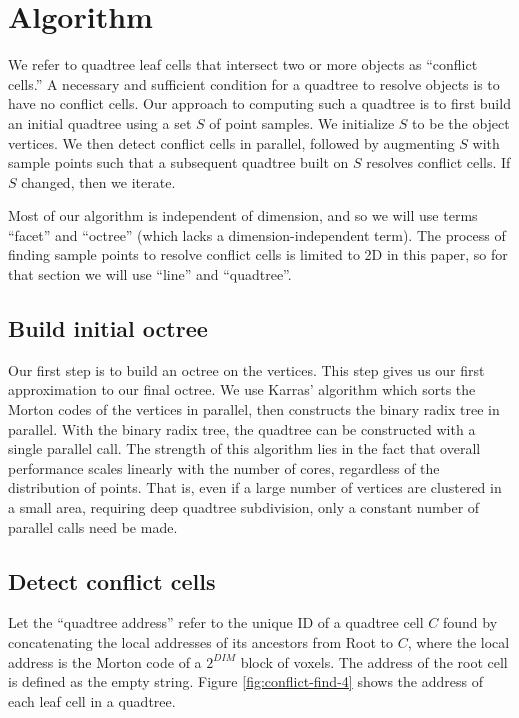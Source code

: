 \documentclass[submission]{gmp2017}
\begin{document}
\section{Algorithm}
\label{sec:algorithm}

We refer to quadtree leaf cells that intersect two or more objects as ``conflict cells.'' A necessary and sufficient condition for a quadtree to resolve objects is to have no conflict cells. Our approach to computing such a quadtree is to first build an initial quadtree using a set $S$ of point samples. We initialize $S$ to be the object vertices. We then detect conflict cells in parallel, followed by augmenting $S$ with sample points such that a subsequent quadtree built on $S$ resolves conflict cells. If $S$ changed, then we iterate.

Most of our algorithm is independent of dimension, and so we will use terms ``facet'' and ``octree'' (which lacks a dimension-independent term). The process of finding sample points to resolve conflict cells is limited to 2D in this paper, so for that section we will use ``line'' and ``quadtree''.

\subsection{Build initial octree}
\label{sec:build-initial-octree}
Our first step is to build an octree on the vertices. This step gives us our first approximation to our final octree. We use Karras' algorithm \cite{karras2012maximizing} which sorts the Morton codes of the vertices in parallel, then constructs the binary radix tree in parallel. With the binary radix tree, the quadtree can be constructed with a single parallel call. The strength of this algorithm lies in the fact that overall performance scales linearly with the number of cores, regardless of the distribution of points. That is, even if a large number of vertices are clustered in a small area, requiring deep quadtree subdivision, only a constant number of parallel calls need be made.

\subsection{Detect conflict cells}

Let the ``quadtree address'' refer to the unique ID of a quadtree cell $C$ found by concatenating the local addresses of its ancestors from Root to $C$, where the local address is the Morton code of a $2^{DIM}$ block of voxels. The address of the root cell is defined as the empty string. Figure \ref{fig:conflict-find-4} shows the address of each leaf cell in a quadtree.
\end{document}
